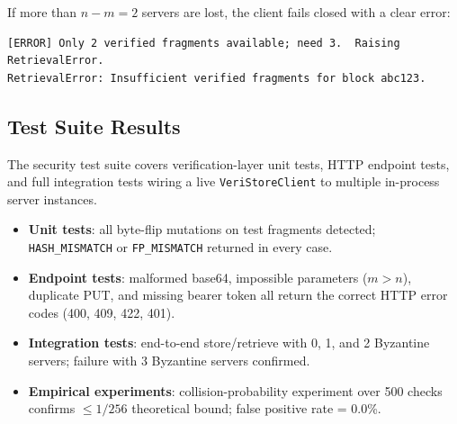\documentclass[10pt]{article}
\begin{document}
If more than $n - m = 2$ servers are lost, the client fails closed with a clear error:

\begin{lstlisting}
[ERROR] Only 2 verified fragments available; need 3.  Raising RetrievalError.
RetrievalError: Insufficient verified fragments for block abc123.
\end{lstlisting}

\subsection{Test Suite Results}

The security test suite covers verification-layer unit tests, HTTP endpoint tests, and
full integration tests wiring a live \texttt{VeriStoreClient} to multiple in-process
server instances.

\begin{itemize}
  \item \textbf{Unit tests}: all byte-flip mutations on test fragments detected;
        \texttt{HASH\_MISMATCH} or \texttt{FP\_MISMATCH} returned in every case.
  \item \textbf{Endpoint tests}: malformed base64, impossible parameters
        ($m > n$), duplicate PUT, and missing bearer token all return the correct
        HTTP error codes (400, 409, 422, 401).
  \item \textbf{Integration tests}: end-to-end store/retrieve with 0, 1, and 2
        Byzantine servers; failure with 3 Byzantine servers confirmed.
  \item \textbf{Empirical experiments}: collision-probability experiment over 500 checks
        confirms $\leq 1/256$ theoretical bound; false positive rate = 0.0\%.
\end{itemize}
\end{document}
